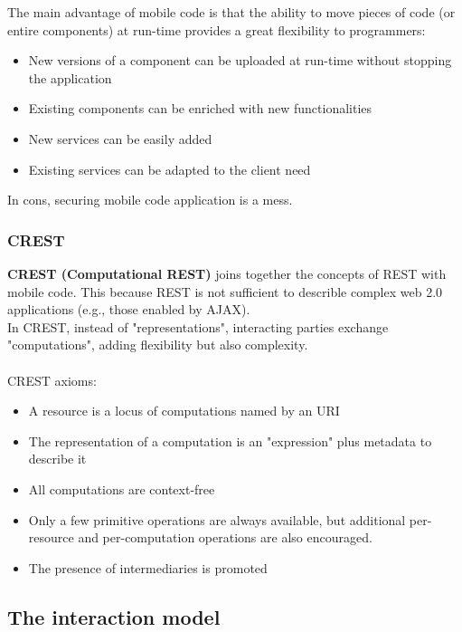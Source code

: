 \documentclass[10pt,a4paper]{article}
\begin{document}
The main advantage of mobile code is that the ability to move pieces of code (or entire components) at run-time provides a great flexibility to programmers:
\begin{itemize}
	\item New versions of a component can be uploaded at run-time without stopping the application
	\item Existing components can be enriched with new functionalities
	\item New services can be easily added
	\item Existing services can be adapted to the client need
\end{itemize}
In cons, securing mobile code application is a mess.
\subsubsection{CREST}
\textbf{CREST (Computational REST)} joins together the concepts of REST with mobile code. This because REST is not sufficient to describle complex web 2.0 applications (e.g., those enabled by AJAX). \\
In CREST, instead of "representations", interacting parties exchange "computations", adding flexibility but also complexity.\\ \\
CREST axioms:
\begin{itemize}
	\item A resource is a locus of computations named by an URI
	\item The representation of a computation is an "expression" plus metadata to describe it
	\item All computations are context-free
	\item Only a few primitive operations are always available, but additional per-resource and per-computation operations are also encouraged.
	\item The presence of intermediaries is promoted
\end{itemize}
\subsection{The interaction model}
\end{document}
